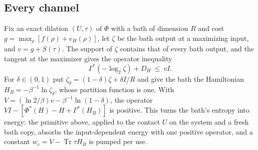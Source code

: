 \documentclass[11pt]{article}
\theoremstyle{definition}
\theoremstyle{remark}
\newcommand{\Tr}{\operatorname{Tr}}
\begin{document}
\subsection{Every channel}

Fix an exact dilation $(U,\tau)$ of $\Phi$ with a bath of dimension $R$ and cost $g=\max_\rho[f(\rho)+e_H(\rho)]$, let $\zeta$ be the bath output at a maximizing input, and $v=g+S(\tau)$. The support of $\zeta$ contains that of every bath output, and the tangent at the maximizer gives the operator inequality
\[
\Gamma^*(-\log_2\zeta)+D_H\ \le\ vI.
\]
For $\delta\in(0,1)$ put $\zeta_\delta=(1-\delta)\zeta+\delta I/R$ and give the bath the Hamiltonian $H_B=-\beta^{-1}\ln\zeta_\delta$, whose partition function is one. With $V=(\ln2/\beta)v-\beta^{-1}\ln(1-\delta)$, the operator $VI-[\Phi^*(H)-H+\Gamma^*(H_B)]$ is positive. This turns the bath's entropy into energy: the primitive above, applied to the contact $U$ on the system and a fresh bath copy, absorbs the input-dependent energy with one positive operator, and a constant $w_c=V-\Tr\tau H_B$ is pumped per use.
\end{document}
